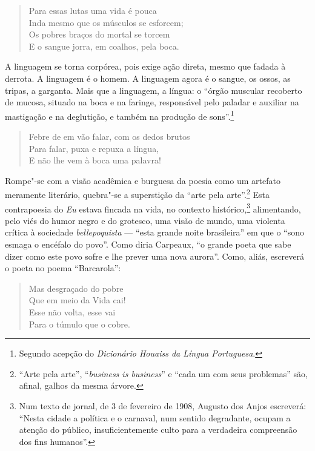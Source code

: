 \begin{verse}
Para essas lutas uma vida é pouca\\
Inda mesmo que os músculos se esforcem; \\
Os pobres braços do mortal se torcem \\
E o sangue jorra, em coalhos, pela boca.
\end{verse}

A linguagem se torna corpórea, pois exige ação direta, mesmo que
fadada à derrota. A linguagem é o homem. A linguagem agora é o sangue,
os ossos, as tripas, a garganta. Mais que a linguagem, a língua: o
“órgão muscular recoberto de mucosa, situado na boca e na faringe,
responsável pelo paladar e auxiliar na mastigação e na deglutição, e
também na produção de sons”.\footnote{ Segundo acepção do
\textit{Dicionário Houaiss da Língua Portuguesa}.}

\begin{verse}
Febre de em vão falar, com os dedos brutos\\
Para falar, puxa e repuxa a língua,\\
E não lhe vem à boca uma palavra!
\end{verse}

Rompe"-se com a visão acadêmica e burguesa da poesia como um artefato
meramente literário, quebra"-se a superstição da “arte pela
arte”.\footnote{ “Arte pela arte”, “\textit{business is business}” e
“cada um com seus problemas” são, afinal, galhos da mesma árvore.}
Esta contrapoesia do \textit{Eu} estava fincada na vida, no contexto
histórico,\footnote{ Num texto de jornal, de 3 de fevereiro de 1908,
Augusto dos Anjos escreverá: “Nesta cidade a política e o carnaval, num
sentido degradante, ocupam a atenção do público, insuficientemente
culto para a verdadeira compreensão dos fins humanos”.} alimentando,
pelo viés do humor negro e do grotesco, uma visão de mundo, uma
violenta crítica à sociedade \textit{bellepoquista} --- “esta grande
noite brasileira” em que o “sono esmaga o encéfalo do povo”. Como diria
Carpeaux, “o grande poeta que sabe dizer como este povo sofre e lhe
prever uma nova aurora”. Como, aliás, escreverá o poeta no poema
“Barcarola”:

\begin{verse}
Mas desgraçado do pobre\\
Que em meio da Vida cai!\\
Esse não volta, esse vai \\
Para o túmulo que o cobre.
\end{verse}

